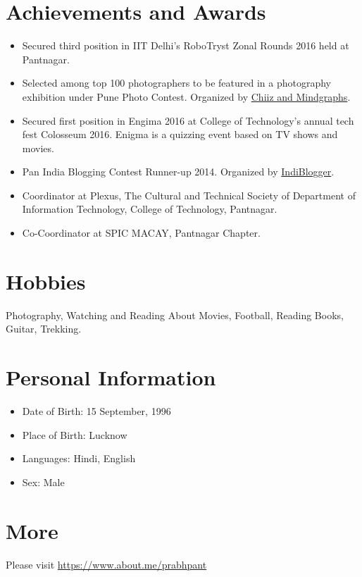 \documentclass[margin, centered]{res}
\begin{document}
\begin{resume}
\section{Achievements and Awards}
\begin{itemize}[leftmargin=*]
 \item Secured third position in IIT Delhi's RoboTryst Zonal Rounds 2016 held at Pantnagar.
 \item Selected among top 100 photographers to be featured in a photography exhibition under Pune Photo Contest. Organized by {\href{https://www.chiiz.com/}{Chiiz and Mindgraphs}}.
 \item Secured first position in Engima 2016 at College of Technology's annual tech fest Colosseum 2016. Enigma is a quizzing event based on TV shows and movies.
 \item Pan India Blogging Contest Runner-up 2014. Organized by {\href{https://www.indiblogger.in/}{IndiBlogger}}.
 \item Coordinator at Plexus, The Cultural and Technical Society of Department of Information Technology, College of Technology, Pantnagar.
 \item Co-Coordinator at SPIC MACAY, Pantnagar Chapter.


\end{itemize}


\section{Hobbies}
Photography, Watching and Reading About Movies, Football, Reading Books, Guitar, Trekking.


\section{Personal \hspace{2mm} Information}
\begin{itemize}[leftmargin=*]
 \item Date of Birth: 15 September, 1996
 \item Place of Birth: Lucknow
 \item Languages: Hindi, English
 \item Sex: Male


\end{itemize}

\section{More}
Please visit \href{https://www.about.me/prabhpant}{https://www.about.me/prabhpant}

\end{resume}
\end{document}
